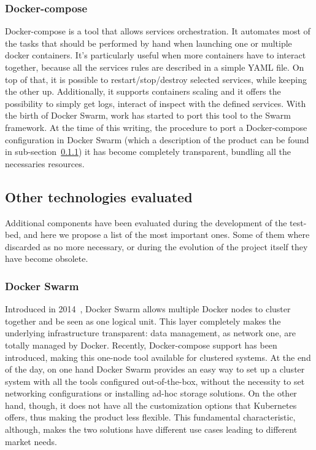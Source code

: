 \subsubsection{Docker-compose} 
Docker-compose is a tool that allows services orchestration. It automates most
of the tasks that should be performed by hand when launching one or multiple
docker containers. It's particularly useful when more containers have to
interact together, because all the services rules are described in a simple YAML
file. On top of that, it is possible to restart/stop/destroy selected services,
while keeping the other up. Additionally, it supports containers scaling and it
offers the possibility to simply get logs, interact of inspect with the defined
services. With the birth of Docker Swarm, work has started to port this tool to
the Swarm framework. At the time of this writing, the procedure to port a
Docker-compose configuration in Docker Swarm (which a description of the product
can be found in sub-section~\ref{chap:prjan:sec:tech:sub:other:sub:swarm}) it
has become completely transparent, bundling all the necessaries resources.

\subsection{Other technologies evaluated}

Additional components have been evaluated during the development of the 
test-bed, and here we propose a list of the most important ones. Some of them 
where discarded as no more necessary, or during the evolution of the project 
itself they have become obsolete.

\subsubsection{Docker Swarm}
\label{chap:prjan:sec:tech:sub:other:sub:swarm}
Introduced in 2014~\cite{swarmGit}, Docker Swarm allows multiple Docker nodes to
cluster together and be seen as one logical unit. This layer completely makes
the underlying infrastructure transparent: data management, as network one, are
totally managed by Docker. Recently, Docker-compose support has been introduced,
making this one-node tool available for clustered systems. At the end of the
day, on one hand Docker Swarm provides an easy way to set up a cluster system
with all the tools configured out-of-the-box, without the necessity to set
networking configurations or installing ad-hoc storage solutions. On the other
hand, though, it does not have all the customization options that Kubernetes
offers, thus making the product less flexible. This fundamental characteristic,
although, makes the two solutions have different use cases leading to different
market needs.

